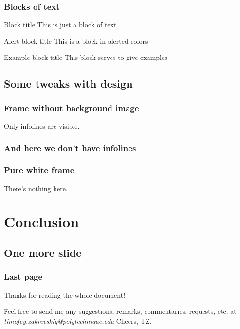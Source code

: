 \documentclass{beamer}
\begin{document}
\begin{frame}
\frametitle{Blocks of text}
\begin{block}{Block title}
This is just a block of text
\end{block}

\begin{alertblock}{Alert-block title}
This is a block in alerted colors
\end{alertblock}

\begin{exampleblock}{Example-block title}
This block serves to give examples
\end{exampleblock}
\end{frame}

\subsection{Some tweaks with design}
{
\begin{frame}
\frametitle{Frame without background image}


Only infolines are visible.
\end{frame}
}

{
\begin{frame}
\frametitle{And here we don't have infolines}
\end{frame}
}

{
\begin{frame}
\frametitle{Pure white frame}

There's nothing here.

\end{frame}
}

\section{Conclusion}
\subsection{One more slide}
\begin{frame}
\frametitle{Last page}
Thanks for reading the whole document!

Feel free to send me any suggestions, remarks, commentaries, requests, etc. at \textit{{\color{Xblue}timofey.zakrevskiy@polytechnique.edu}}
\vfill
Cheers, TZ.
\end{frame}
\end{document}
